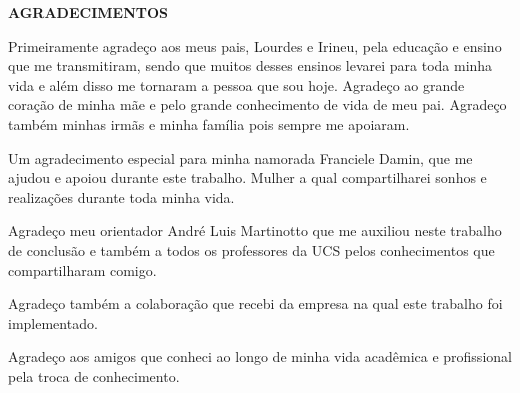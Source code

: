 \begin{center}
\textbf{AGRADECIMENTOS}
\end{center}

Primeiramente agradeço aos meus pais, Lourdes e Irineu, pela educação e ensino que me transmitiram, sendo que
muitos desses ensinos levarei para toda minha vida e além disso me tornaram a pessoa que sou hoje. Agradeço ao 
grande coração de minha mãe e pelo grande conhecimento de vida de meu pai. Agradeço também minhas irmãs e minha família pois sempre me apoiaram.

Um agradecimento especial para minha namorada Franciele Damin, que me ajudou e apoiou durante este trabalho. Mulher a qual compartilharei 
sonhos e realizações durante toda minha vida.

Agradeço meu orientador André Luis Martinotto que me auxiliou neste trabalho de conclusão e também a todos os professores da UCS pelos 
conhecimentos que compartilharam comigo.

Agradeço também a colaboração que recebi da empresa na qual este trabalho foi implementado.

Agradeço aos amigos que conheci ao longo de minha vida acadêmica e profissional pela troca de conhecimento.
